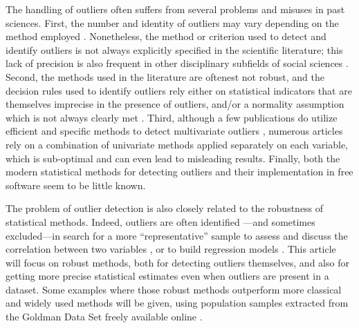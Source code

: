 \documentclass[review, 3p]{elsarticle}
\begin{document}
The handling of outliers often suffers from several problems and misuses in past sciences. First, the number and identity of outliers may vary depending on the method employed \citep{lightfoot2014_WaterConsumptionIron}. Nonetheless, the method or criterion used to detect and identify outliers is not always explicitly specified in the scientific literature; this lack of precision is also frequent in other disciplinary subfields of social sciences \citep{leys2013_DetectingOutliersNot}. Second, the methods used in the literature are oftenest not robust, and the decision rules used to identify outliers rely either on statistical indicators that are themselves imprecise in the presence of outliers, and/or a normality assumption which is not always clearly met \citep[e.g.,][]{wright2005_IdentifyingImmigrantsTikal,webb2013_ExploringGeographicOrigins}. Third, although a few publications do utilize efficient and specific methods to detect multivariate outliers \citep[e.g.,][]{harris1988_PrincipalComponentsAnalysis,mahoney2006_DentalMicrowearNatufian,algee-hewitt2016_PopulationInferenceContemporary}, numerous articles rely on a combination of univariate methods applied separately on each variable, which is sub-optimal and can even lead to misleading results. Finally, both the modern statistical methods for detecting outliers and their implementation in free software seem to be little known. 

The problem of outlier detection is also closely related to the robustness of statistical methods. Indeed, outliers are often identified ---and sometimes excluded---in search for a more ``representative'' sample to assess and discuss the correlation between two variables \citep[e.g.,][]{loftus2012_TechnicalNoteInterpreting}, or to build regression models \citep[e.g.,][]{beck_DonThrowBaby}. This article will focus on robust methods, both for detecting outliers themselves, and also for getting more precise statistical estimates even when outliers are present in a dataset. Some examples where those robust methods outperform more classical and widely used methods will be given, using population samples extracted from the Goldman Data Set freely available online \citep{auerbach2004_HumanBodyMass}. 
\end{document}
